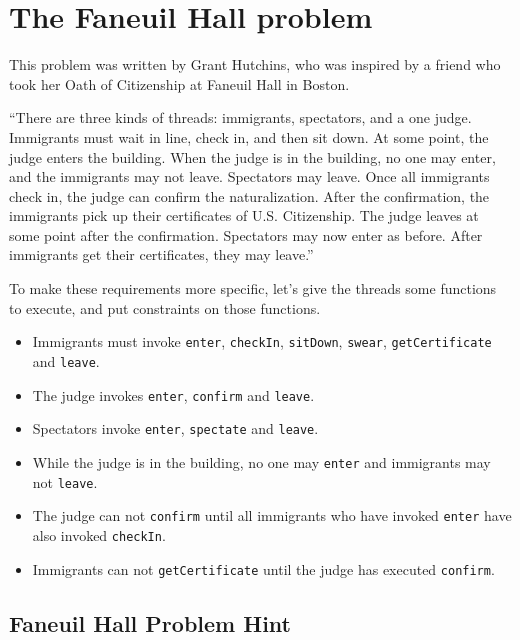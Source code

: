 \documentclass{book}
\begin{document}
\section{The Faneuil Hall problem}

This problem was written by Grant Hutchins, who was inspired
by a friend who took her
Oath of Citizenship at Faneuil Hall in Boston.

``There are three kinds of threads: immigrants, spectators, and a one
judge.  Immigrants must wait in line, check in, and then sit down.  At
some point, the judge enters the building.  When the judge is in the
building, no one may enter, and the immigrants may not leave.
Spectators may leave.  Once all immigrants check in, the judge can
confirm the naturalization.  After the confirmation, the immigrants
pick up their certificates of U.S. Citizenship.  The judge leaves at
some point after the confirmation.  Spectators may now enter as
before.  After immigrants get their certificates, they may leave.''

To make these requirements more specific, let's give the threads
some functions to execute, and put constraints on those functions.

\begin{itemize}

    \item Immigrants must invoke {\tt enter}, {\tt checkIn}, {\tt sitDown},
          {\tt swear}, {\tt getCertificate} and {\tt leave}.

    \item The judge invokes {\tt enter}, {\tt confirm} and {\tt leave}.

    \item Spectators invoke {\tt enter}, {\tt spectate} and {\tt leave}.

    \item While the judge is in the building, no one may {\tt enter}
          and immigrants may not {\tt leave}.

    \item The judge can not {\tt confirm} until all immigrants who have
          invoked {\tt enter} have also invoked {\tt checkIn}.

    \item Immigrants can not {\tt getCertificate} until the judge
          has executed {\tt confirm}.

\end{itemize}


\subsection {Faneuil Hall Problem Hint}
\end{document}
